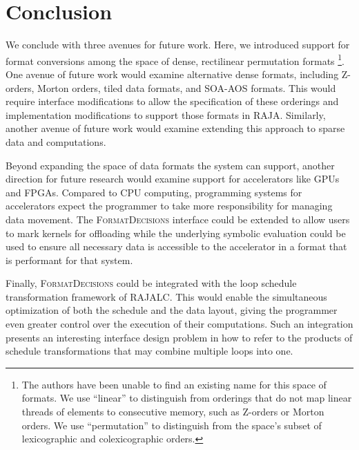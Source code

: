 \documentclass{report}
\newcounter{col}
\newcommand{\FormatDecisions}[0]{{\textsc{FormatDecisions}}}
\begin{document}



%

%

%
%



\chapter{Conclusion}




We conclude with three avenues for future work.
Here, we introduced support for format conversions among the space of dense, rectilinear permutation formats
\footnote{The authors have been unable to find an existing name for this space of formats. We use \enquote{linear} to distinguish from orderings that do not map linear threads of elements to consecutive memory, such as Z-orders or Morton orders. We use \enquote{permutation} to distinguish from the space's subset of lexicographic and colexicographic orders.}. 
One avenue of future work would examine alternative dense formats, including Z-orders, Morton orders, tiled data formats, and SOA-AOS formats.
This would require interface modifications to allow the specification of these orderings and implementation modifications to support those formats in RAJA.
Similarly, another avenue of future work would examine extending this approach to sparse data and computations. 

Beyond expanding the space of data formats the system can support, another direction for future research would examine support for accelerators like GPUs and FPGAs.
Compared to CPU computing, programming systems for accelerators expect the programmer to take more responsibility for managing data movement.
The \FormatDecisions{} interface could be extended to allow users to mark kernels for offloading while the underlying symbolic evaluation could be used to ensure all necessary data is accessible to the accelerator in a format that is performant for that system. 

Finally, \FormatDecisions{} could be integrated with the loop schedule transformation framework of RAJALC. 
This would enable the simultaneous optimization of both the schedule and the data layout, giving the programmer even greater control over the execution of their computations.
Such an integration presents an interesting interface design problem in how to refer to the products of schedule transformations that may combine multiple loops into one. 
\end{document}
